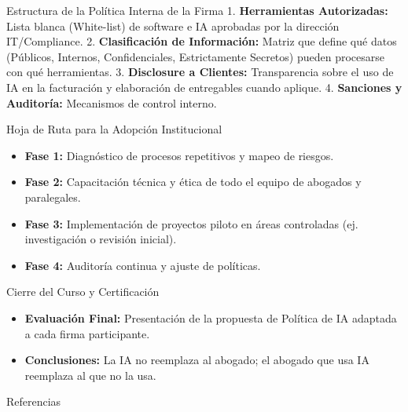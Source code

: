 \documentclass[aspectratio=169]{beamer}
\begin{document}
\begin{frame}{Estructura de la Política Interna de la Firma}
1. \textbf{Herramientas Autorizadas:} Lista blanca (White-list) de software e IA aprobadas por la dirección IT/Compliance.
2. \textbf{Clasificación de Información:} Matriz que define qué datos (Públicos, Internos, Confidenciales, Estrictamente Secretos) pueden procesarse con qué herramientas.
3. \textbf{Disclosure a Clientes:} Transparencia sobre el uso de IA en la facturación y elaboración de entregables cuando aplique.
4. \textbf{Sanciones y Auditoría:} Mecanismos de control interno.
\end{frame}


\begin{frame}{Hoja de Ruta para la Adopción Institucional}
\begin{itemize}
  \item \textbf{Fase 1:} Diagnóstico de procesos repetitivos y mapeo de riesgos.
  \item \textbf{Fase 2:} Capacitación técnica y ética de todo el equipo de abogados y paralegales.
  \item \textbf{Fase 3:} Implementación de proyectos piloto en áreas controladas (ej. investigación o revisión inicial).
  \item \textbf{Fase 4:} Auditoría continua y ajuste de políticas.
\end{itemize}
\end{frame}


\begin{frame}{Cierre del Curso y Certificación}
\begin{itemize}
  \item \textbf{Evaluación Final:} Presentación de la propuesta de Política de IA adaptada a cada firma participante.
  \item \textbf{Conclusiones:} La IA no reemplaza al abogado; el abogado que usa IA reemplaza al que no la usa.
\end{itemize}
\end{frame}



\begin{frame}[allowframebreaks]{Referencias}
  
  
\end{frame}
\end{document}
